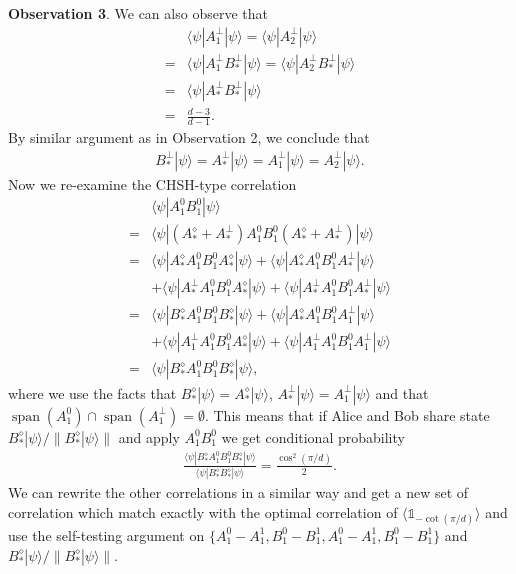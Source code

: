 \documentclass[11pt,letterpaper]{article}
\newcommand{\ket}[1]{|#1\rangle}
\newcommand{\bra}[1]{\langle#1|}
\DeclareMathOperator{\spn}{span}
\newcommand{\1}{\mathbb{1}}
\theoremstyle{definition}
\begin{document}
\textbf{Observation 3}. We can also observe that
\begin{align}
	&\bra{\psi}A_1^\perp\ket{\psi} = \bra{\psi}A_2^\perp\ket{\psi} \\
	= &\bra{\psi}A_1^\perp B_\ast^\perp\ket{\psi} = \bra{\psi}A_2^\perp B_\ast^\perp\ket{\psi} \\
	=& \bra{\psi} A_\ast^\perp B_\ast^\perp \ket{\psi}\\
	=& \frac{d-3}{d-1}.
\end{align}
By similar argument as in Observation 2, we conclude that 
\begin{align}
	B_\ast^\perp \ket{\psi} = A_\ast^\perp \ket{\psi} = A_1^\perp \ket{\psi} = A_2^\perp \ket{\psi}.
\end{align}
Now we re-examine the CHSH-type correlation
\begin{align}
	   &\bra{\psi} A_1^0B_1^0 \ket{\psi} \\
	= &\bra{\psi}(A_\ast^\diamond + A_\ast^\perp) A_1^0B_1^0 (A_\ast^\diamond + A_\ast^\perp)\ket{\psi} \\
	= & \bra{\psi}A_\ast^\diamond A_1^0B_1^0 A_\ast^\diamond\ket{\psi} + \bra{\psi}A_\ast^\diamond A_1^0B_1^0 A_\ast^\perp\ket{\psi} \\
	&+\bra{\psi}A_\ast^\perp A_1^0B_1^0 A_\ast^\diamond\ket{\psi} + \bra{\psi}A_\ast^\perp A_1^0B_1^0 A_\ast^\perp\ket{\psi}\\
	= & \bra{\psi}B_\ast^\diamond A_1^0B_1^0 B_\ast^\diamond\ket{\psi} + \bra{\psi}A_\ast^\diamond A_1^0B_1^0 A_1^\perp\ket{\psi} \\
	&+\bra{\psi}A_1^\perp A_1^0B_1^0 A_\ast^\diamond\ket{\psi} + \bra{\psi}A_1^\perp A_1^0B_1^0 A_1^\perp\ket{\psi}\\
	=&\bra{\psi}B_\ast^\diamond A_1^0B_1^0 B_\ast^\diamond\ket{\psi},
\end{align}
where we use the facts that $B_\ast^\diamond \ket{\psi} = A_\ast^\diamond \ket{\psi}$, $A_\ast^\perp \ket{\psi} = A_1^\perp \ket{\psi}$ and that 
$\spn(A_1^0) \cap \spn(A_1^\perp) = \emptyset$. This means that if Alice and Bob share state $B_\ast^\diamond \ket{\psi}/\|B_\ast^\diamond \ket{\psi}\|$ and apply $A_1^0B_1^0$
we get conditional probability
\begin{align}
	\frac{\bra{\psi}B_\ast^\diamond A_1^0B_1^0 B_\ast^\diamond\ket{\psi}}{\bra{\psi} B_\ast^\diamond B_\ast^\diamond \ket{\psi}} = \frac{\cos^2(\pi/d)}{2}.
\end{align} 
We can rewrite the other correlations in a similar way and get a new set of correlation which match exactly with the optimal correlation of $\langle \1_{-\cot(\pi/d)}\rangle$ and use the self-testing argument on $\{A_1^0-A_1^1, B_1^0-B_1^1, A_1^0-A_1^1, B_1^0-B_1^1\}$ and $B_\ast^\diamond \ket{\psi}/\|B_\ast^\diamond \ket{\psi}\|$.
\end{document}
